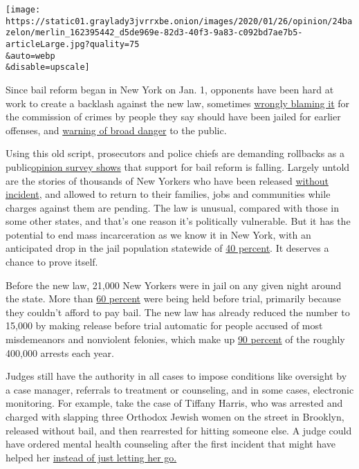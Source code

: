 \texttt{[image: https://static01.graylady3jvrrxbe.onion/images/2020/01/26/opinion/24bazelon/merlin\_162395442\_d5de969e-82d3-40f3-9a83-c092bd7ae7b5-articleLarge.jpg?quality=75\\\&auto=webp\\\&disable=upscale]}

Since bail reform began in New York on Jan. 1, opponents have been hard
at work to create a backlash against the new law, sometimes
\href{https://www.newsday.com/long-island/suffolk/jordan-randolph-bail-new-york-1.40686221}{wrongly
blaming it} for the commission of crimes by people they say should have
been jailed for earlier offenses, and
\href{https://www.nytimes3xbfgragh.onion/2020/01/23/opinion/shea-nypd-bail-reform.html}{warning
of broad danger} to the public.

Using this old script, prosecutors and police chiefs are demanding
rollbacks as a
public\href{https://nypost.com/2020/01/21/new-york-voters-have-turned-against-bail-reform-new-poll-says/}{opinion
survey shows} that support for bail reform is falling. Largely untold
are the stories of thousands of New Yorkers who have been released
\href{https://www.nydailynews.com/opinion/ny-oped-bail-reform-is-already-working-20200122-yyj35x7v4rc6te5djpprmnseye-story.html}{without
incident}, and allowed to return to their families, jobs and communities
while charges against them are pending. The law is unusual, compared
with those in some other states, and that's one reason it's politically
vulnerable. But it has the potential to end mass incarceration as we
know it in New York, with an anticipated drop in the jail population
statewide of
\href{https://www.vera.org/downloads/publications/new-york-new-york-2019-bail-reform-law-highlights.pdf}{40
percent}. It deserves a chance to prove itself.

Before the new law, 21,000 New Yorkers were in jail on any given night
around the state. More than
\href{https://www.vera.org/state-of-incarceration}{60 percent} were
being held before trial, primarily because they couldn't afford to pay
bail. The new law has already reduced the number to 15,000 by making
release before trial automatic for people accused of most misdemeanors
and nonviolent felonies, which make up
\href{https://www.criminaljustice.ny.gov/crimnet/ojsa/adult-arrest-demographics/2018/NYS.pdf}{90
percent} of the roughly 400,000 arrests each year.

Judges still have the authority in all cases to impose conditions like
oversight by a case manager, referrals to treatment or counseling, and
in some cases, electronic monitoring. For example, take the case of
Tiffany Harris, who was arrested and charged with slapping three
Orthodox Jewish women on the street in Brooklyn, released without bail,
and then rearrested for hitting someone else. A judge could have ordered
mental health counseling after the first incident that might have helped
her
\href{https://dailycaller.com/2019/12/30/new-york-anti-semitic-bail-reform-tiffany-harris/}{instead
of just letting her go.}

